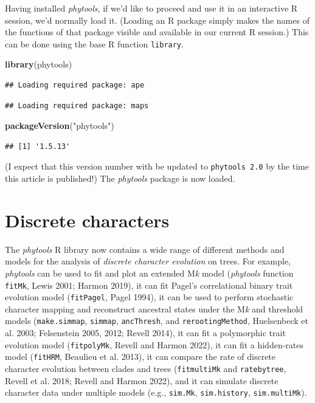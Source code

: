 \documentclass[fleqn,10pt,lineno]{wlpeerj} %
\newenvironment{Shaded}{\begin{snugshade}}{\end{snugshade}}
\newcommand{\FunctionTok}[1]{\textcolor[rgb]{0.13,0.29,0.53}{\textbf{#1}}}
\newcommand{\NormalTok}[1]{#1}
\newcommand{\StringTok}[1]{\textcolor[rgb]{0.31,0.60,0.02}{#1}}
\begin{document}
Having installed \emph{phytools}, if we'd like to proceed and use it in an interactive R session, we'd normally load it. (Loading an R package simply makes the names of the functions of that package visible and available in our current R session.) This can be done using the base R function \texttt{library}.

\begin{Shaded}
\begin{Highlighting}[]
\FunctionTok{library}\NormalTok{(phytools)}
\end{Highlighting}
\end{Shaded}

\begin{verbatim}
## Loading required package: ape
\end{verbatim}

\begin{verbatim}
## Loading required package: maps
\end{verbatim}

\begin{Shaded}
\begin{Highlighting}[]
\FunctionTok{packageVersion}\NormalTok{(}\StringTok{"phytools"}\NormalTok{)}
\end{Highlighting}
\end{Shaded}

\begin{verbatim}
## [1] '1.5.13'
\end{verbatim}

(I expect that this version number with be updated to \texttt{phytools\ 2.0} by the time this article is published!) The \emph{phytools} package is now loaded.

\hypertarget{discrete-characters}{%
\section{Discrete characters}\label{discrete-characters}}

The \emph{phytools} R library now contains a wide range of different methods and models for the analysis of \emph{discrete character evolution} on trees. For example, \emph{phytools} can be used to fit and plot an extended M\emph{k} model (\emph{phytools} function \texttt{fitMk}, Lewis 2001; Harmon 2019), it can fit Pagel's correlational binary trait evolution model (\texttt{fitPagel}, Pagel 1994), it can be used to perform stochastic character mapping and reconstruct ancestral states under the M\emph{k} and threshold models (\texttt{make.simmap}, \texttt{simmap}, \texttt{ancThresh}, and \texttt{rerootingMethod}, Huelsenbeck et al. 2003; Felsenstein 2005, 2012; Revell 2014), it can fit a polymorphic trait evolution model (\texttt{fitpolyMk}, Revell and Harmon 2022), it can fit a hidden-rates model (\texttt{fitHRM}, Beaulieu et al. 2013), it can compare the rate of discrete character evolution between clades and trees (\texttt{fitmultiMk} and \texttt{ratebytree}, Revell et al. 2018; Revell and Harmon 2022), and it can simulate discrete character data under multiple models (e.g., \texttt{sim.Mk}, \texttt{sim.history}, \texttt{sim.multiMk}).
\end{document}
